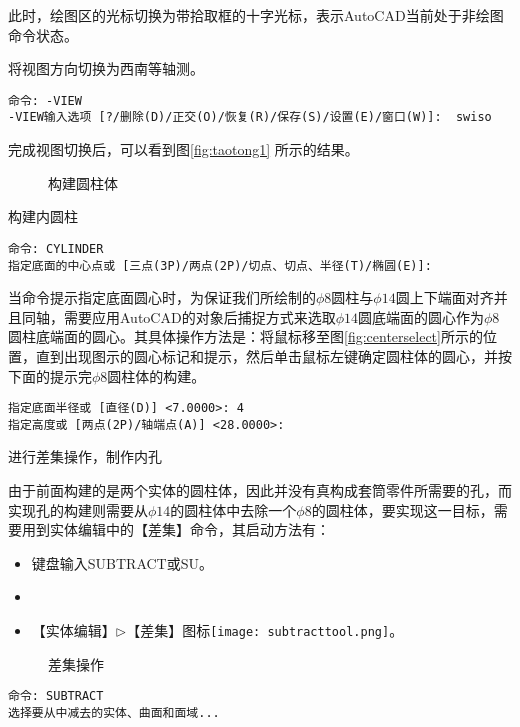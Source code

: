 \begin{procedure}
此时，绘图区的光标切换为带拾取框的十字光标，表示AutoCAD当前处于非绘图命令状态。
\item 将视图方向切换为西南等轴测。
\begin{lstlisting}
命令: -VIEW
-VIEW输入选项 [?/删除(D)/正交(O)/恢复(R)/保存(S)/设置(E)/窗口(W)]:  swiso
\end{lstlisting}

完成视图切换后，可以看到图\ref{fig:taotong1} 所示的结果。
\begin{figure}[htbp]
\centering
{}\hspace{20pt}
\hspace{20pt}
\caption{构建圆柱体}
\end{figure}

\item 构建内圆柱
\begin{lstlisting}
命令: CYLINDER
指定底面的中心点或 [三点(3P)/两点(2P)/切点、切点、半径(T)/椭圆(E)]:
\end{lstlisting}

当命令提示指定底面圆心时，为保证我们所绘制的$\phi 8$圆柱与$\phi 14$圆上下端面对齐并且同轴，需要应用AutoCAD的对象后捕捉方式来选取$\phi 14$圆底端面的圆心作为$\phi 8$圆柱底端面的圆心。其具体操作方法是：将鼠标移至图\ref{fig:centerselect}所示的位置，直到出现图示的圆心标记和提示，然后单击鼠标左键确定圆柱体的圆心，并按下面的提示完$\phi 8$圆柱体的构建。
\begin{lstlisting}
指定底面半径或 [直径(D)] <7.0000>: 4
指定高度或 [两点(2P)/轴端点(A)] <28.0000>:
\end{lstlisting}


\item 进行差集操作，制作内孔

由于前面构建的是两个实体的圆柱体，因此并没有真构成套筒零件所需要的孔，而实现孔的构建则需要从$\phi 14$的圆柱体中去除一个$\phi 8$的圆柱体，要实现这一目标，需要用到实体编辑中的【差集】命令，其启动方法有：
\begin{itemize}
\item 键盘输入SUBTRACT或SU。
\item {}
\item 【实体编辑】$\triangleright$【差集】图标\texttt{[image: subtracttool.png]}。
\end{itemize}
\begin{figure}[htbp]
\centering
{}\hspace{40pt}
\caption{差集操作}
\end{figure}
\begin{lstlisting}
命令: SUBTRACT
选择要从中减去的实体、曲面和面域...
\end{lstlisting}


\end{procedure}
